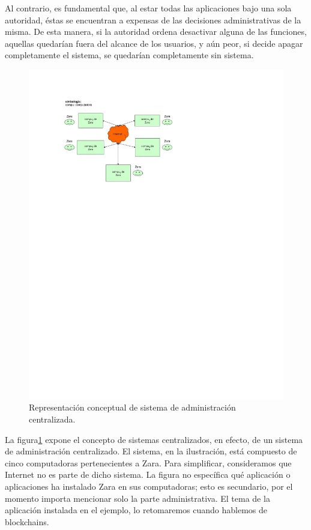 \documentclass[12pt]{report} %
\begin{document}
Al contrario, es fundamental que, al estar todas las aplicaciones bajo una sola autoridad, éstas se encuentran a expensas de las decisiones administrativas de la misma. De esta manera, si la autoridad ordena desactivar alguna de las funciones, aquellas quedarían fuera del alcance de los usuarios, y aún peor, si decide apagar completamente el sistema, se quedarían completamente sin sistema. 



\begin{figure}
\centering
\includegraphics[width=0.85\columnwidth]{imagenes/imagendesc3.pdf}
\caption{Representación conceptual de sistema de administración centralizada.}
\label{imagendesc3}
\end{figure} 

La figura\ref{imagendesc3} expone el concepto de sistemas centralizados, en efecto, de un sistema de administración centralizado. El sistema, en la ilustración, está compuesto de cinco computadoras pertenecientes a Zara. Para simplificar, consideramos que Internet no es parte de dicho sistema. La figura no específica qué aplicación o aplicaciones ha instalado Zara en sus computadoras; esto es secundario, por el momento importa mencionar solo la parte administrativa. El tema de la aplicación instalada en el ejemplo, lo retomaremos cuando hablemos de blockchains.
\end{document}
